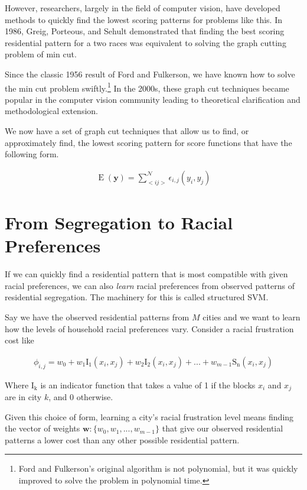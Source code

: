 However, researchers, largely in the field of computer vision, have
developed methods to quickly find the lowest scoring patterns for
problems like this. In 1986, Greig, Porteous, and Sehult demonstrated
that finding the best scoring residential pattern for a two races 
was equivalent to solving the graph cutting problem of min
cut.\cite{greig_exact_1989}

 Since the classic 1956 result of Ford and Fulkerson, we have known
 how to solve the min cut problem swiftly.\footnote{Ford and Fulkerson's
   original algorithm is not polynomial, but it was quickly improved
   to solve the problem in polynomial time.\cite{ford_maximal_1956}}
 In the 2000s, these graph cut techniques became popular in the
 computer vision community leading to theoretical
 clarification and methodological extension.\cite{kolmogorov_what_2004}

We now have a set of graph cut techniques that allow us to find, or
approximately find, the lowest scoring pattern for score functions
that have the following form.

\begin{align}
\operatorname{E}(\mathbf{y}) = \sum_{<i j>}^{\mathcal{N}}\epsilon_{i,j}(y_i,y_j)
\end{align}

\section*{From Segregation to Racial Preferences}
If we can quickly find a residential pattern that is most compatible
with given racial preferences, we can also \emph{learn} racial
preferences from observed patterns of residential segregation. The
machinery for this is called structured SVM. 

Say we have the observed residential patterns from $M$ cities and we
want to learn how the levels of household racial preferences
vary. Consider a racial frustration cost like

\begin{align}
  \phi_{i,j} = w_0 + w_1\operatorname{I_1}(x_{i}, x_{j}) +
  w_2\operatorname{I_2}(x_{i}, x_{j}) + ... +
  w_{m-1}\operatorname{S_n}(x_{i},x_{j})  
\end{align} 

Where $\operatorname{I_k}$ is an indicator function that takes a value
of 1 if the blocks $x_{i}$ and $x_j$ are in city $k$, and 0 otherwise.

Given this choice of form, learning a city's racial frustration level
means finding the vector of weights $\mathbf{w}: \{w_0, w_1, ..., w_{m-1}\}$ that give our observed residential patterns a lower
cost than any other possible residential pattern.


